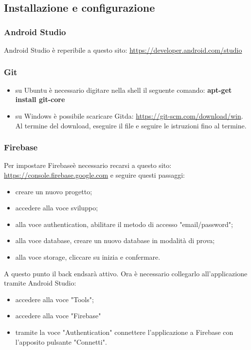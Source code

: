\subsection{Installazione e configurazione}
\subsubsection{Android Studio} 
Android Studio è reperibile a questo sito: \url{https://developer.android.com/studio}
\subsubsection{Git}
\begin{itemize}
	\item su Ubuntu è necessario digitare nella shell il seguente comando: \textbf{apt-get install git-core}
	\item su Windows è possibile scaricare Git\glosp da: \url{https://git-scm.com/download/win}.
	Al termine del download, eseguire il file e seguire le istruzioni fino al termine.
\end{itemize}
\subsubsection{Firebase}
Per impostare Firebase\glosp è necessario recarsi a questo sito: \url{https://console.firebase.google.com} e seguire questi passaggi:
\begin{itemize}
	\item creare un nuovo progetto;
	\item accedere alla voce sviluppo;
	\item alla voce authentication, abilitare il metodo di accesso "email/password";
	\item alla voce database, creare un nuovo database in modalità di prova;
	\item alla voce storage, cliccare su inizia e confermare.
\end{itemize}
A questo punto il back end\glosp sarà attivo. Ora è necessario collegarlo all'applicazione tramite Android Studio:
\begin{itemize}
	\item accedere alla voce "Tools";
	\item accedere alla voce "Firebase"
	\item tramite la voce "Authentication" connettere l'applicazione a Firebase con l'apposito pulsante "Connetti".
\end{itemize}
 

